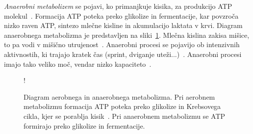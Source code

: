 \emph{Anaerobni metabolizem} se pojavi, ko primanjkuje kisika, za produkcijo ATP molekul~\cite{patel2017aerobic}. Formacija ATP poteka preko glikolize in fermentacije, kar povzroča nizko raven ATP, sintezo mlečne kisline in akumulacijo laktata v krvi. Diagram anaerobnega metabolizma je predstavljen na sliki~\ref{fig:metabolism}. Mlečna kislina zakisa mišice, to pa vodi v mišično utrujenost~\cite{sahlin1998energy}. Anaerobni procesi se pojavijo ob intenzivnih aktivnostih, ki trajajo kratek čas (sprint, dviganje uteži...)~\cite{patel2017aerobic}. Anaerobni procesi imajo tako veliko moč, vendar nizko kapaciteto~\cite{sahlin1998energy}.


\begin{figure}[!htbp]
\centering
\resizebox {\columnwidth} {!}{

}
 \caption[Diagram aerobnega in anaerobnega metabolizma]{Diagram aerobnega in anaerobnega metabolizma. Pri aerobnem metabolizmu formacija ATP poteka preko glikolize in Krebsovega cikla, kjer se porablja kisik~\cite{scott2005misconceptions}. Pri anaerobnem metabolizmu se ATP formirajo preko glikolize in fermentacije.}
 \label{fig:metabolism}
\end{figure}
